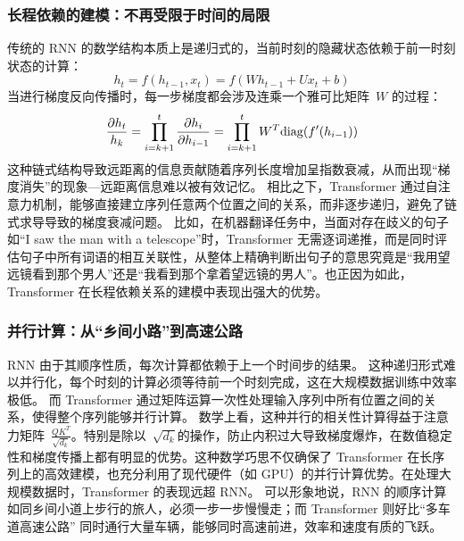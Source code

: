   \subsubsection*{ 长程依赖的建模：不再受限于时间的局限 }
 传统的 RNN 的数学结构本质上是递归式的，当前时刻的隐藏状态依赖于前一时刻状态的计算：
  $$
 h_t = f\left ( h_{t-1} , x_t \right)=  f\left ( Wh_{t-1} +U x_t +b \right)
 $$
 当进行梯度反向传播时，每一步梯度都会涉及连乘一个雅可比矩阵~$W$ 的过程：
 $$
\frac{ \partial h_t }{h_k}= \prod_{i=k+1}^t \frac{\partial h_i}{\partial h_{i-1}} =\prod_{i=k+1}^t W^T {\rm diag}( f^\prime(h_{i-1}))
 $$
这种链式结构导致远距离的信息贡献随着序列长度增加呈指数衰减，从而出现“梯度消失”的现象---远距离信息难以被有效记忆。
相比之下，Transformer 通过自注意力机制，能够直接建立序列任意两个位置之间的关系，而非逐步递归，避免了链式求导导致的梯度衰减问题。
比如，在机器翻译任务中，当面对存在歧义的句子如“I saw the man with a telescope”时，Transformer 无需逐词递推，而是同时评估句子中所有词语的相互关联性，从整体上精确判断出句子的意思究竟是“我用望远镜看到那个男人”还是“我看到那个拿着望远镜的男人”。也正因为如此，Transformer 在长程依赖关系的建模中表现出强大的优势。
  \subsubsection*{ 并行计算：从“乡间小路”到高速公路 }
RNN 由于其顺序性质，每次计算都依赖于上一个时间步的结果。
这种递归形式难以并行化，每个时刻的计算必须等待前一个时刻完成，这在大规模数据训练中效率极低。
而 Transformer 通过矩阵运算一次性处理输入序列中所有位置之间的关系，使得整个序列能够并行计算。
数学上看，这种并行的相关性计算得益于注意力矩阵~$\frac{QK^T}{\sqrt{d_k}}​$。特别是除以~$\sqrt{d_k}$​​的操作，防止内积过大导致梯度爆炸，在数值稳定性和梯度传播上都有明显的优势。这种数学巧思不仅确保了 Transformer 在长序列上的高效建模，也充分利用了现代硬件（如 GPU）的并行计算优势。在处理大规模数据时，Transformer 的表现远超 RNN。
可以形象地说，RNN 的顺序计算如同乡间小道上步行的旅人，必须一步一步慢慢走；而 Transformer 则好比“多车道高速公路” 同时通行大量车辆，能够同时高速前进，效率和速度有质的飞跃。
